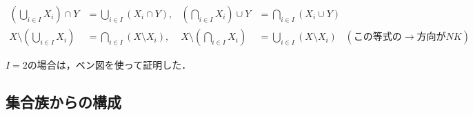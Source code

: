 \documentclass[uplatex,dvipdfmx]{jsreport}
\begin{document}
\begin{proposition}
    \begin{align*}
        \left(\bigcup_{i\in I}X_i\right)\cap Y &= \bigcup_{i\in I}(X_i\cap Y), &\left(\bigcap_{i\in I}X_i\right)\cup Y &= \bigcap_{i\in I}(X_i\cup Y)\\
        X\setminus\left(\bigcup_{i\in I}X_i\right)&=\bigcap_{i\in I}(X\setminus X_i), &X\setminus\left(\bigcap_{i\in I}X_i\right)&=\bigcup_{i\in I}(X\setminus X_i)\;\;\;(この等式の\rightarrow 方向がNK)
    \end{align*}
\end{proposition}
$I=2$の場合は，ベン図を使って証明した．

\subsection{集合族からの構成}
\end{document}
